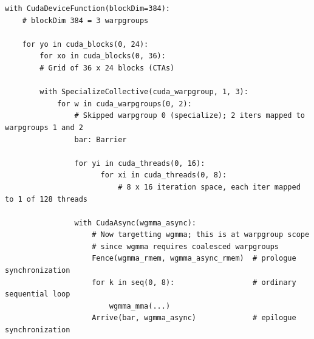 \newpage
{}
\begin{verbatim}
with CudaDeviceFunction(blockDim=384):
    # blockDim 384 = 3 warpgroups

    for yo in cuda_blocks(0, 24):
        for xo in cuda_blocks(0, 36):
        # Grid of 36 x 24 blocks (CTAs)

        with SpecializeCollective(cuda_warpgroup, 1, 3):
            for w in cuda_warpgroups(0, 2):
                # Skipped warpgroup 0 (specialize); 2 iters mapped to warpgroups 1 and 2
                bar: Barrier

                for yi in cuda_threads(0, 16):
                      for xi in cuda_threads(0, 8):
                          # 8 x 16 iteration space, each iter mapped to 1 of 128 threads

                with CudaAsync(wgmma_async):
                    # Now targetting wgmma; this is at warpgroup scope
                    # since wgmma requires coalesced warpgroups
                    Fence(wgmma_rmem, wgmma_async_rmem)  # prologue synchronization
                    for k in seq(0, 8):                  # ordinary sequential loop
                        wgmma_mma(...)
                    Arrive(bar, wgmma_async)             # epilogue synchronization
\end{verbatim}

\newpage
{}

